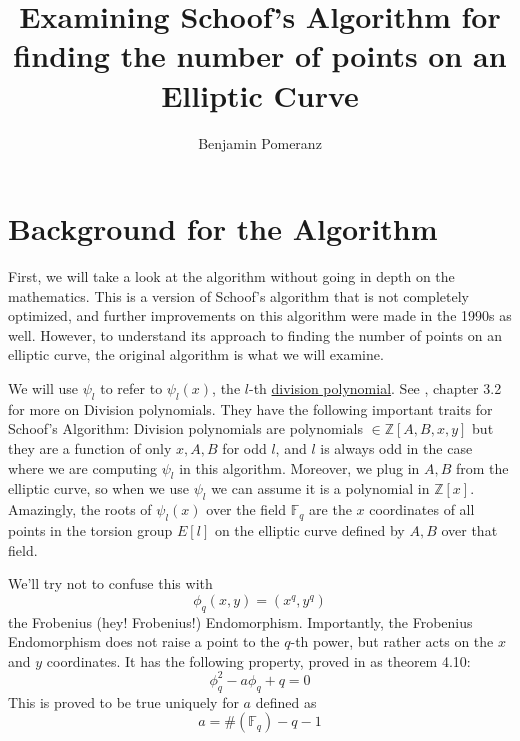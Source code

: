 \documentclass[11pt,reqno]{amsart}
\title{Examining Schoof's Algorithm for finding the number of points on an Elliptic Curve}
\author{Benjamin Pomeranz}
\theoremstyle{definition}
\begin{document}



\maketitle

\section{Background for the Algorithm}

First, we will take a look at the algorithm without going in depth on the mathematics. This is a version of Schoof's algorithm that is not completely optimized, and further improvements on this algorithm were made in the 1990s as well. However, to understand its approach to finding the number of points on an elliptic curve, the original algorithm is what we will examine.

We will use $\psi_l$ to refer to $\psi_l(x)$, the $l$-th \href{https://en.wikipedia.org/wiki/Division_polynomials}{division polynomial}. See \cite{Washington}, chapter 3.2 for more on Division polynomials. They have the following important traits for Schoof's Algorithm: Division polynomials are polynomials $\in \mathbb{Z}[A,B,x,y]$ but they are a function of only $x, A, B$ for odd $l$, and $l$ is always odd in the case where we are computing $\psi_l$ in this algorithm. Moreover, we plug in $A,B$ from the elliptic curve, so when we use $\psi_l$ we can assume it is a polynomial in $\mathbb{Z}[x]$. Amazingly, the roots of $\psi_l(x)$ over the field $\mathbb{F}_q$ are the $x$ coordinates of all points in the torsion group $E[l]$ on the elliptic curve defined by $A, B$ over that field. 

We'll try not to confuse this with $$\phi_q(x, y) = (x^q, y^q)$$ the Frobenius (hey! Frobenius!) Endomorphism. Importantly, the Frobenius Endomorphism does not raise a point to the $q$-th power, but rather acts on the $x$ and $y$ coordinates. It has the following property, proved in \cite{Washington} as theorem 4.10: $$\phi_q^2 - a\phi_q + q = 0$$ This is proved to be true uniquely for $a$ defined as $$a = \#(\mathbb{F}_q) - q - 1$$
\end{document}
